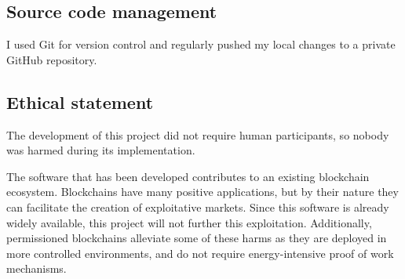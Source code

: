 \subsection{Source code management}

I used Git for version control and regularly pushed my local changes to a private GitHub repository.

\subsection{Ethical statement}
The development of this project did not require human participants, so nobody was harmed during its implementation.

The software that has been developed contributes to an existing blockchain ecosystem. Blockchains have many positive applications, but by their nature they can facilitate the creation of exploitative markets. Since this software is already widely available, this project will not further this exploitation. Additionally, permissioned blockchains alleviate some of these harms as they are deployed in more controlled environments, and do not require energy-intensive proof of work mechanisms.